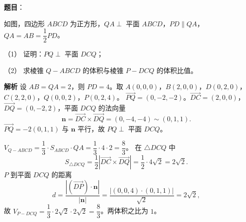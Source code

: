 \begin{answer}

\textbf{题目}：

如图，四边形 $ABCD$ 为正方形，$QA\perp$ 平面 $ABCD$，$PD\parallel QA$，$QA=AB=\dfrac12PD$。

（1） 证明：$PQ\perp$ 平面 $DCQ$；

（2） 求棱锥 $Q-ABCD$ 的体积与棱锥 $P-DCQ$ 的体积比值。
\nopagebreak[4]
\begin{center}\end{center}
\nopagebreak[4]
\textbf{解析}
设 $AB=QA=2$，则 $PD=4$。取 $A(0,0,0)$，$B(2,0,0)$，$D(0,2,0)$，$C(2,2,0)$，$Q(0,0,2)$，$P(0,2,4)$。
$\overrightarrow{PQ}=(0,-2,-2)$。$\overrightarrow{DC}=(2,0,0)$，$\overrightarrow{DQ}=(0,-2,2)$，平面 $DCQ$ 的法向量
\nopagebreak[4]
\[\boldsymbol n=\overrightarrow{DC}\times\overrightarrow{DQ}=(0,-4,-4)\sim(0,1,1).\]
$\overrightarrow{PQ}=-2(0,1,1)$ 与 $\boldsymbol n$ 平行，故 $PQ\perp$ 平面 $DCQ$。

$V_{Q-ABCD}=\dfrac13\cdot S_{ABCD}\cdot QA=\dfrac13\cdot4\cdot2=\dfrac83$。
在 $\triangle DCQ$ 中
\nopagebreak[4]
\[S_{\triangle DCQ}=\frac12|\overrightarrow{DC}\times\overrightarrow{DQ}|=\frac12\cdot4\sqrt2=2\sqrt2.\]
$P$ 到平面 $DCQ$ 的距离
\nopagebreak[4]
\[d=\frac{|(\overrightarrow{DP})\cdot\boldsymbol n|}{|\boldsymbol n|}=\frac{|(0,0,4)\cdot(0,1,1)|}{\sqrt2}=2\sqrt2,\]
故 $V_{P-DCQ}=\dfrac13\cdot2\sqrt2\cdot2\sqrt2=\dfrac83$。两体积之比为 $1$。



\end{answer}
